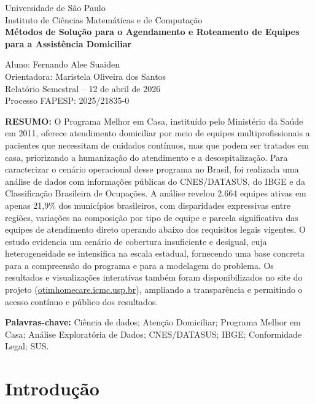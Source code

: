 \documentclass[12pt]{article}
\begin{document}
\begin{center}
    Universidade de São Paulo \\
    Instituto de Ciências Matemáticas e de Computação \\
    \vspace{0.8cm}
    {\Large \textbf{Métodos de Solução para o Agendamento e Roteamento de Equipes para a Assistência Domiciliar}} \\
\end{center}

\vspace{0.3cm}
\noindent
Aluno: Fernando Alee Suaiden \\
Orientadora: Maristela Oliveira dos Santos \\
Relatório Semestral -- 12 de abril de 2026 \\
Processo FAPESP: 2025/21835-0

\vspace{0.5cm}
\noindent
\textbf{RESUMO:} O Programa Melhor em Casa, instituído pelo Ministério da Saúde em 2011, oferece atendimento domiciliar por meio de equipes multiprofissionais a pacientes que necessitam de cuidados contínuos, mas que podem ser tratados em casa, priorizando a humanização do atendimento e a desospitalização. Para caracterizar o cenário operacional desse programa no Brasil, foi realizada uma análise de dados com informações públicas do CNES/DATASUS, do IBGE e da Classificação Brasileira de Ocupações. A análise revelou 2.664 equipes ativas em apenas 21,9\% dos municípios brasileiros, com disparidades expressivas entre regiões, variações na composição por tipo de equipe e parcela significativa das equipes de atendimento direto operando abaixo dos requisitos legais vigentes. O estudo evidencia um cenário de cobertura insuficiente e desigual, cuja heterogeneidade se intensifica na escala estadual, fornecendo uma base concreta para a compreensão do programa e para a modelagem do problema. Os resultados e visualizações interativas também foram disponibilizados no site do projeto (\href{https://otimhomecare.icmc.usp.br/index.html}{otimhomecare.icmc.usp.br}), ampliando a transparência e permitindo o acesso contínuo e público dos resultados.

\vspace{0.3cm}
\noindent
\textbf{Palavras-chave:} Ciência de dados; Atenção Domiciliar; Programa Melhor em Casa; Análise Exploratória de Dados; CNES/DATASUS; IBGE; Conformidade Legal; SUS.

\newpage
\section{Introdução}
\end{document}
